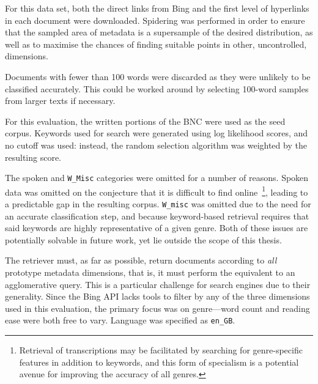 For this data set, both the direct links from Bing and the first level of hyperlinks in each document were downloaded.  Spidering was performed in order to ensure that the sampled area of metadata is a supersample of the desired distribution, as well as to maximise the chances of finding suitable points in other, uncontrolled, dimensions.

Documents with fewer than 100 words were discarded as they were unlikely to be classified accurately.  This could be worked around by selecting 100-word samples from larger texts if necessary.

For this evaluation, the written portions of the BNC were used as the seed corpus.  Keywords used for search were generated using log likelihood scores, and no cutoff was used: instead, the random selection algorithm was weighted by the resulting score.

The spoken and \texttt{W\_Misc} categories were omitted for a number of reasons.  Spoken data was omitted on the conjecture that it is difficult to find online~\footnote{Retrieval of transcriptions may be facilitated by searching for genre-specific features in addition to keywords, and this form of specialism is a potential avenue for improving the accuracy of all genres.}, leading to a predictable gap in the resulting corpus.  \texttt{W\_misc} was omitted due to the need for an accurate classification step, and because keyword-based retrieval requires that said keywords are highly representative of a given genre.  Both of these issues are potentially solvable in future work, yet lie outside the scope of this thesis.


The retriever must, as far as possible, return documents according to \textsl{all} prototype metadata dimensions, that is, it must perform the equivalent to an agglomerative query.  This is a particular challenge for search engines due to their generality.  Since the Bing API lacks tools to filter by any of the three dimensions used in this evaluation, the primary focus was on genre---word count and reading ease were both free to vary.  Language was specified as \texttt{en\_GB}.











